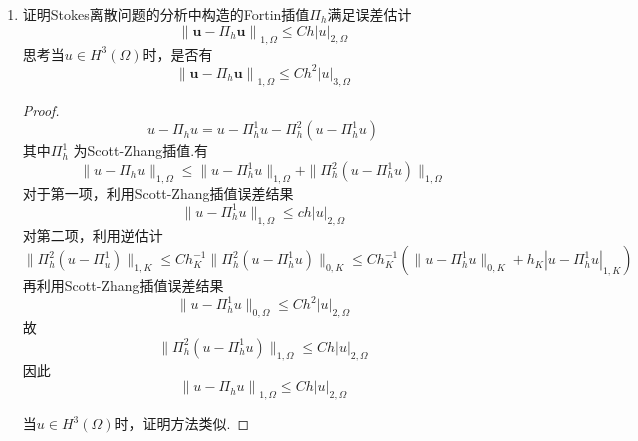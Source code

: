 \documentclass[12pt,a4paper]{article}
\begin{document}
\begin{enumerate}
\begin{enumerate}
			\item $b(\Pi_h^2\mathbf{v},q_h)=b(\mathbf{v},q_h),\:\forall q_h\in Q_h$
			
			\begin{proof}
				由$\Pi_h^2 v$的定义有
				\begin{equation*}
					\begin{aligned}
						&\int_e (v-\Pi^2_h v) \cdot \nu q_h ds=0,\quad \forall q_h \in Q_h, \quad \forall e \in \partial K \\
						\Rightarrow & \int_{\partial K} (v-\Pi^2_h v) \cdot \nu q_h ds=0 ,\quad \forall q_h \in Q_h\\
						\Rightarrow & \int_K \mathrm{div}(v-\Pi^2_{h}v) q_h dx = 0,\quad \forall q_h \in Q_h, \quad \forall K \subset \Gamma_h \\
						\Rightarrow & \int_{\Omega} \mathrm{div}(v-\Pi^2_{h}v) q_h dx = 0,\quad \forall q_h \in Q_h \\
						\Rightarrow & b(v-\Pi^2_{h}v,q_h) = 0,\quad \forall q_h \in Q_h		
					\end{aligned}
				\end{equation*}
				
			\end{proof}
		\end{enumerate}
		
		\item 证明Stokes离散问题的分析中构造的Fortin插值$\Pi_h$满足误差估计
		$$\left\|\mathbf{u}-\Pi_h\mathbf{u}\right\|_{1,\Omega}\leq Ch\left|u\right|_{2,\Omega}$$
		思考当$u\in H^3(\Omega)$时，是否有
		$$\left\|\mathbf{u}-\Pi_h\mathbf{u}\right\|_{1,\Omega}\leq Ch^2\left|u\right|_{3,\Omega}$$
		
		\begin{proof}
			$$u - \Pi_h u = u- \Pi_h^1 u - \Pi_h^2(u-\Pi_h^1 u)$$
			其中$\Pi_h^1$ 为Scott-Zhang插值.有
			$$\|u-\Pi_h u\|_{1,\Omega}\leq\|u-\Pi_h^1 u\|_{1,\Omega}+\|\Pi_h^2 (u-\Pi_h^1 u)\|_{1,\Omega}$$
			对于第一项，利用Scott-Zhang插值误差结果
			$$\|u-\Pi_h^1 u\|_{1,\Omega} \leq ch|u|_{2,\Omega}$$
			对第二项，利用逆估计
			$$\|\Pi_h^2 (u-\Pi^1_u)\|_{1,K} \leq C h_K^{-1} \|\Pi_h^2(u-\Pi_h^1 u)\|_{0,K} \leq Ch_K^{-1}(\|u-\Pi_h^1 u\|_{0,K}+h_K|u-\Pi_h^1 u|_{1,K}) $$
			再利用Scott-Zhang插值误差结果
			$$\|u-\Pi_h^1 u\|_{0,\Omega}\leq Ch^2|u|_{2,\Omega}$$
			故$$\|\Pi_h^2 (u-\Pi_h^1 u)\|_{1,\Omega}\leq Ch|u|_{2,\Omega}$$
			因此
			$$\left\|u-\Pi_h u\right\|_{1,\Omega}\leq Ch\left|u\right|_{2,\Omega}$$
			
			当$u\in H^3(\Omega)$时，证明方法类似.
			

\end{proof}
\end{enumerate}
\end{document}
